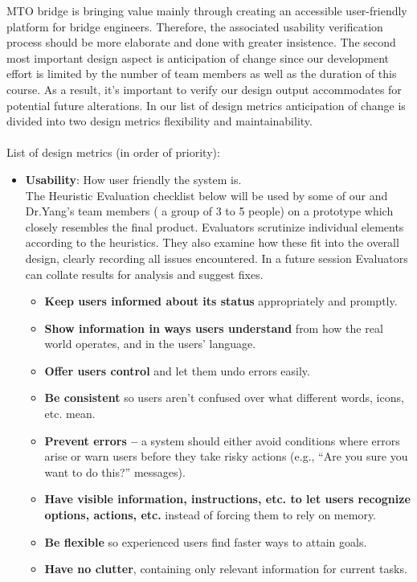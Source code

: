 \documentclass[12pt, titlepage]{article}
\begin{document}
MTO bridge is bringing value mainly through creating an accessible user-friendly platform for bridge engineers. Therefore, the associated usability verification process 
should be more elaborate and done with greater insistence. The second most important design aspect is anticipation of change since our development effort is limited by the 
number of team members as well as the duration of this course. As a result, it’s important to verify our design output accommodates for potential future alterations. 
In our list of design metrics anticipation of change is divided into two design metrics flexibility and maintainability.\\\\
List of design metrics (in order of priority):
\begin{itemize}
\item \textbf{Usability}: How user friendly the system is. \\
The Heuristic Evaluation checklist below will be used by some of our and Dr.Yang’s team members ( a group of 3 to 5 people) on a prototype which closely resembles the final product. Evaluators scrutinize individual elements according to the heuristics. They also examine how these fit into the overall design, clearly recording all issues encountered. In a future session Evaluators can collate results for analysis and suggest fixes.
    \begin{itemize}
    \item \textbf{Keep users informed about its status} appropriately and promptly. 
    \item\textbf{Show information in ways users understand } from how the real world operates, and in the users’ language.
    \item\textbf{Offer users control} and let them undo errors easily.
    \item\textbf{Be consistent} so users aren’t confused over what different words, icons, etc. mean.
    \item\textbf{Prevent errors –} a system should either avoid conditions where errors arise or warn users before they take risky actions (e.g., “Are you sure you want to do this?” messages).
    \item\textbf{Have visible information, instructions, etc. to let users recognize options, actions, etc.} instead of forcing them to rely on memory.
    \item\textbf{Be flexible } so experienced users find faster ways to attain goals.
    \item\textbf{Have no clutter}, containing only relevant information for current tasks.

\end{itemize}
\end{itemize}
\end{document}
